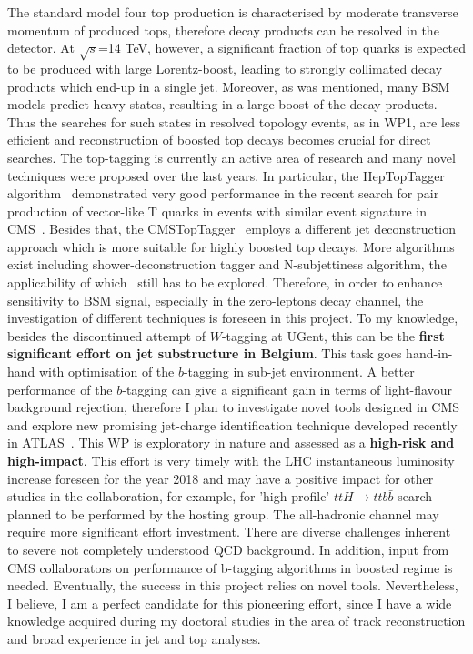 \textcolor{\mynew}{
The standard model four top production is characterised by moderate transverse momentum of produced tops, therefore decay products can be resolved in the detector. At $\sqrt{s}$=14 TeV, however, a significant fraction of top quarks is expected to be produced with large Lorentz-boost, leading to strongly collimated decay products which end-up in a single jet. 
Moreover, as was mentioned, many BSM models predict heavy states, resulting in a large boost of the decay products. Thus the searches for such states in resolved topology events, as in WP1, are less efficient and reconstruction of boosted top decays becomes crucial for direct searches. 
}
\textcolor{\mynew}{
The top-tagging is currently an active area of research and many novel techniques were proposed over the last years. In particular, the HepTopTagger algorithm~\cite{heptoptagger} demonstrated very good performance in the recent search for pair production of vector-like T quarks in events with similar event signature in CMS~\cite{Khachatryan:2015oba}. Besides that, the CMSTopTagger~\cite{Kaplan:2008ie} employs a different jet deconstruction approach which is more suitable for highly boosted top decays. More algorithms exist including shower-deconstruction tagger and N-subjettiness algorithm, the applicability of which~\cite{CMS:2014fya} still has to be explored. Therefore, in order to enhance sensitivity to BSM \fourtop signal, especially in the zero-leptons decay channel, the investigation of different techniques is foreseen in this project. To my knowledge, besides the discontinued attempt of $W$-tagging at UGent, this can be the \textbf{first significant effort on jet substructure in Belgium}.
}
\textcolor{\mynew}{
This task goes hand-in-hand with optimisation of the $b$-tagging in sub-jet environment. A better performance of the $b$-tagging can give a significant gain in terms of light-flavour background rejection, therefore I plan to investigate novel tools designed in CMS~\cite{Bertolini:2014bba} and explore new promising jet-charge identification technique developed recently in ATLAS~\cite{Aad:2015cua,ATLAS:2015jetcharge}.
}
\textcolor{\mynew}{
This WP is exploratory in nature and assessed as a \textbf{high-risk and high-impact}. This effort is very timely with the LHC instantaneous luminosity increase foreseen for the year 2018 and may have a positive impact for other studies in the collaboration, for example, for 'high-profile' $ttH \rightarrow ttb\bar{b}$ search planned to be performed by the hosting group. The all-hadronic channel may require more significant effort investment. There are diverse challenges inherent to severe not completely understood QCD background. In addition, input from CMS collaborators on performance of b-tagging algorithms in boosted regime is needed. Eventually, the success in this project relies on novel tools. Nevertheless, I believe, I am a perfect candidate for this pioneering effort, since I have a wide knowledge acquired during my doctoral studies in the area of track reconstruction and broad experience in jet and top analyses.
}
